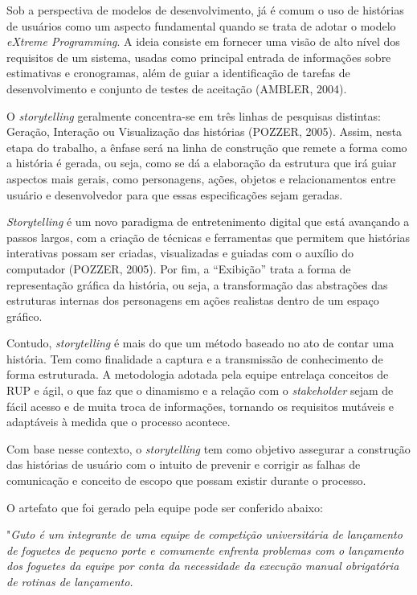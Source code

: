 Sob a perspectiva de modelos de desenvolvimento, já é comum o uso de histórias de usuários como um aspecto fundamental quando se trata de adotar o modelo \textit{eXtreme Programming}. A ideia consiste em fornecer uma visão de alto nível dos requisitos de um sistema, usadas como principal entrada de informações sobre estimativas e cronogramas, além de guiar a identificação de tarefas de desenvolvimento e conjunto de testes de aceitação (AMBLER, 2004). 

O \textit{storytelling} geralmente concentra-se em três linhas de pesquisas distintas: Geração, Interação ou Visualização das histórias (POZZER, 2005). Assim, nesta etapa do trabalho, a ênfase será na linha de construção que remete a forma como a história é gerada, ou seja, como se dá a elaboração da estrutura que irá guiar aspectos mais gerais, como personagens, ações, objetos e relacionamentos entre usuário e desenvolvedor para que essas especificações sejam geradas.

\textit{Storytelling} é um novo paradigma de entretenimento digital que está avançando a passos largos, com a criação de técnicas e ferramentas que permitem que histórias interativas possam ser criadas, visualizadas e guiadas com o auxílio do computador (POZZER, 2005).
Por fim, a “Exibição” trata a forma de representação gráfica da história, ou seja, a transformação das abstrações das estruturas internas dos personagens em ações realistas dentro de um espaço gráfico.

Contudo, \textit{storytelling} é mais do que um método baseado no ato de contar uma história. Tem como finalidade a captura e a transmissão de conhecimento de forma estruturada. A metodologia adotada pela equipe entrelaça conceitos de RUP e ágil, o que faz que o dinamismo e a relação com o \textit{stakeholder} sejam de fácil acesso e de muita troca de informações, tornando os requisitos mutáveis e adaptáveis à medida que o processo acontece.

Com base nesse contexto, o \textit{storytelling} tem como objetivo assegurar a construção das histórias de usuário com o intuito de prevenir e corrigir as falhas de comunicação e conceito de escopo que possam existir durante o processo.

O artefato que foi gerado pela equipe pode ser conferido abaixo:

"\textit{Guto é um integrante de uma equipe de competição universitária de lançamento de foguetes de pequeno porte e comumente enfrenta problemas com o lançamento dos foguetes da equipe por conta da necessidade da execução manual  obrigatória de rotinas de lançamento.}
    
